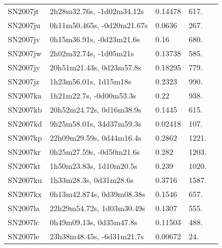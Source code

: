 \begin{longtable}{lllll}
         SN2007jt &      2h28m32.76s, -1d02m34.12s &  0.14478 &           617. &    \citet{2011ApJ...740...92G} \\
         SN2007ju &     0h11m50.465s, -0d20m21.67s &   0.0636 &           267. &    \citet{2011ApJ...740...92G} \\
         SN2007jv &       0h15m36.91s, -0d23m21.6s &     0.16 &           680. &    \citet{2007CBET.1079A...1:} \\
         SN2007jw &         2h02m32.74s, -1d05m21s &  0.13738 &           585. &    \citet{2016SDSSD.C...0000:} \\
         SN2007jy &       20h51m21.43s, 0d23m57.8s &  0.18295 &           779. &    \citet{2011ApJ...731L...4M} \\
         SN2007jz &          1h23m56.01s, 1d15m18s &   0.2323 &           990. &    \citet{2011ApJ...740...92G} \\
         SN2007ka &        1h21m22.7s, -0d00m53.3s &     0.22 &           938. &    \citet{2007CBET.1081A...1:} \\
         SN2007kb &       20h52m24.72s, 0d16m38.9s &   0.1445 &           615. &    \citet{2011ApJ...740...92G} \\
         SN2007kd &       9h25m58.01s, 34d37m59.3s &  0.02418 &           107. &    \citet{1999ApJ...518...69M} \\
         SN2007kp &       22h09m29.59s, 0d44m16.4s &   0.2862 &          1221. &    \citet{2011ApJ...740...92G} \\
         SN2007kr &       0h25m27.59s, -0d50m21.6s &    0.282 &          1203. &    \citet{2011ApJ...740...92G} \\
         SN2007kt &        1h50m23.83s, 1d10m20.5s &    0.239 &          1020. &    \citet{2011ApJ...740...92G} \\
         SN2007ku &         1h33m28.3s, 0d31m28.6s &   0.3716 &          1587. &    \citet{2011ApJ...740...92G} \\
         SN2007kx &      0h13m42.874s, 0d39m08.38s &   0.1546 &           657. &    \citet{2011ApJ...740...92G} \\
         SN2007la &      22h29m54.72s, 1d03m30.49s &   0.1307 &           555. &    \citet{2011ApJ...740...92G} \\
         SN2007lc &        0h49m09.13s, 0d35m47.8s &  0.11503 &           488. &    \citet{2003SDSS1.C...0000:} \\
         SN2007le &      23h38m48.45s, -6d31m21.7s &  0.00672 &            24. &    \citet{2004AJ....128...16K} \\

\end{longtable}
